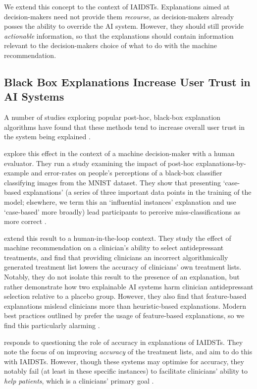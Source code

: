 We extend this concept to the context of IAIDSTs. Explanations aimed at decision-makers need not provide them \emph{recourse}, as decision-makers already posses the ability to override the AI system. However, they should still provide \emph{actionable} information, so that the explanations should contain information relevant to the decision-makers choice of what to do with the machine recommendation.

\subsection{Black Box Explanations Increase User Trust in AI Systems}
A number of studies exploring popular post-hoc, black-box explanation algorithms have found that these methods tend to increase overall user trust in the system being explained \cite{ford_play_2020,jacobs_how_2021,wang_transparency_2022}. 

\textcite{ford_play_2020} explore this effect in the context of a machine decision-maker with a human evaluator. They run a study examining the impact of post-hoc explanations-by-example and error-rates on people's perceptions of a black-box classifier classifying images from the MNIST dataset. They show that presenting `case-based explanations' (a series of three important data points in the training of the model; elsewhere, we term this an `influential instances' explanation and use `case-based' more broadly) lead participants to perceive miss-classifications as more correct \cite{ford_play_2020}.

\textcite{jacobs_how_2021} extend this result to a human-in-the-loop context. They study the effect of machine recommendation on a clinician's ability to select antidepressant treatments, and find that providing clinicians an incorrect algorithmically generated treatment list lowers the accuracy of clinicians' own treatment lists. Notably, they do not isolate this result to the presence of an explanation, but rather demonstrate how two explainable AI systems harm clinician antidepressant selection relative to a placebo group. However, they also find that feature-based explanations mislead clinicians more than heuristic-based explanations. Modern best practices outlined by \textcite{miller_explanation_2017-1} prefer the usage of feature-based explanations, so we find this particularly alarming \cite{jacobs_how_2021}.

\textcite{mccradden_when_2021} responds to \textcite{jacobs_how_2021} questioning the role of accuracy in explanations of IAIDSTs. They note the focus of \textcite{jacobs_how_2021} on improving \emph{accuracy} of the treatment lists, and aim to do this with IAIDSTs. However, though these systems may optimise for accuracy, they notably fail (at least in these specific instances) to facilitate clinicians' ability to \emph{help patients}, which is a clinicians' primary goal \cite{mccradden_when_2021}.

